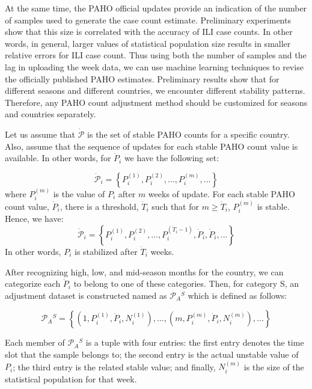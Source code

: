 
At the same time, the PAHO official updates provide an indication of the number of samples
used to generate the case count estimate. Preliminary experiments show that
this size is correlated with the accuracy of ILI case counts. In other words,
in general, larger values of statistical population size results in smaller
relative errors for ILI case count. Thus using both the number of samples and the lag in 
uploading the week data, we can use machine learning techniques to revise the officially 
published PAHO estimates. Preliminary results
show that for different seasons and different countries, we encounter different
stability patterns. Therefore, any PAHO count adjustment method should be
customized for seasons and countries separately. 

Let us assume that $\dot{\mathcal{P}}$ is the set of stable PAHO counts for a
specific country. Also, assume that the sequence of updates for each stable PAHO
count value is available. In other words, for $\dot{P}_i$ we have the following
set:
 
\begin{equation}
\dot{\mathcal{P}}_i = \left \{P_i^{(1)},P_i^{(2)},...,P_i^{(m)},...  \right \}
\end{equation}
\noindent
where $P_i^{(m)}$ is the value of $P_i$ after $m$ weeks of update. 
For each stable PAHO count value, $\dot{P}_i$, there is a threshold, 
$\dot{T}_i$ such that for $m \ge \dot{T}_i$, $P_i^{(m)}$ is stable.
Hence, we have:
\begin{equation}
\dot{\mathcal{P}}_i = \left \{P_i^{(1)},P_i^{(2)},...,P_i
^{(\dot{T}_i-1)},\dot{P}_i,\dot{P}_i,...  \right \}
\end{equation}
\noindent
In other words, $P_i$ is stabilized after $\dot{T}_i$ weeks.



After recognizing high, low, and mid-season months for the country, we can
categorize each $\dot{P}_i$ to belong to one of these categories. Then, for
category S, an adjustment dataset is constructed named as $\mathcal{P}_A{^S}$
which is defined as follows:

\begin{equation}
\mathcal{P}_A{^S} = \left \{ (1,P_i^{(1)},\dot{P}_i,N_i^{(1)}),...,(m,P_i^{(m)},\dot{P}_i,N_i^{(m)}), ...  \right \}
\end{equation}

Each member of $\mathcal{P}_A{^S}$ is a tuple with four entries: the first entry denotes
the time slot that the sample belongs to; the second entry is the actual unstable
value of $P_i$; the third entry is the related stable value; and finally,
$N_i^{(m)}$ is the size of the statistical population for that week.

